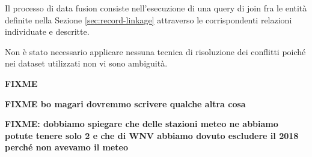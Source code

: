 Il processo di data fusion consiste nell'esecuzione di una query di join 
fra le entità definite nella Sezione \ref{sec:record-linkage} attraverso le 
corrispondenti relazioni individuate e descritte.

Non è stato necessario applicare nessuna tecnica di risoluzione dei conflitti 
poiché nei dataset utilizzati non vi sono ambiguità.

\textbf{FIXME} 

\textbf{FIXME bo magari dovremmo scrivere qualche altra cosa}

\textbf{FIXME: dobbiamo spiegare che delle stazioni meteo ne abbiamo potute 
tenere solo 2 e che di WNV abbiamo dovuto escludere il 2018 perché non avevamo 
il meteo}
